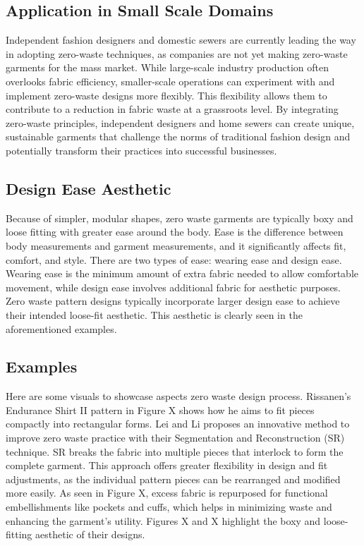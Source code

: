 \subsection{Application in Small Scale Domains}
Independent fashion designers and domestic sewers are currently leading the way in adopting zero-waste techniques, as companies are not yet making zero-waste garments for the mass market. While large-scale industry production often overlooks fabric efficiency, smaller-scale operations can experiment with and implement zero-waste designs more flexibly. This flexibility allows them to contribute to a reduction in fabric waste at a grassroots level. By integrating zero-waste principles, independent designers and home sewers can create unique, sustainable garments that challenge the norms of traditional fashion design and potentially transform their practices into successful businesses.

\subsection{Design Ease Aesthetic}
Because of simpler, modular shapes, zero waste garments are typically boxy and loose fitting with greater ease around the body. Ease is the difference between body measurements and garment measurements, and it significantly affects fit, comfort, and style. There are two types of ease: wearing ease and design ease. Wearing ease is the minimum amount of extra fabric needed to allow comfortable movement, while design ease involves additional fabric for aesthetic purposes. Zero waste pattern designs typically incorporate larger design ease to achieve their intended loose-fit aesthetic. This aesthetic is clearly seen in the aforementioned examples.

\subsection{Examples}
Here are some visuals to showcase aspects zero waste design process. Rissanen's Endurance Shirt II pattern in Figure X shows how he aims to fit pieces compactly into rectangular forms. Lei and Li proposes an innovative method to improve zero waste practice with their Segmentation and Reconstruction (SR) technique. SR breaks the fabric into multiple pieces that interlock to form the complete garment. This approach offers greater flexibility in design and fit adjustments, as the individual pattern pieces can be rearranged and modified more easily. As seen in Figure X, excess fabric is repurposed for functional embellishments like pockets and cuffs, which helps in minimizing waste and enhancing the garment’s utility. Figures X and X highlight the boxy and loose-fitting aesthetic of their designs.

